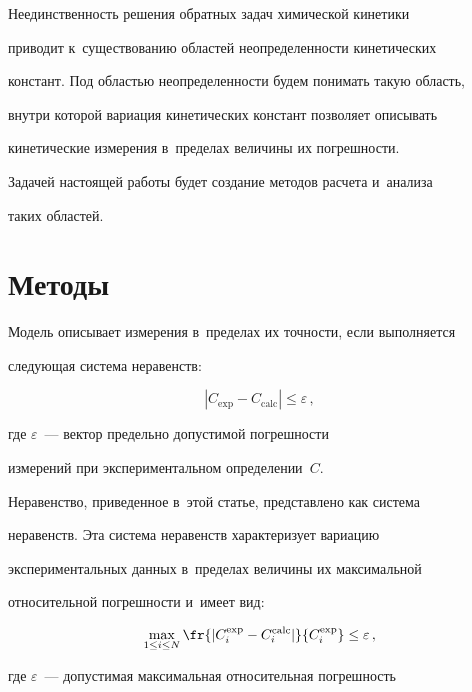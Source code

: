  

  Неединственность решения обратных задач химической кинетики 

приводит к~существованию областей неопределенности кинетических 

констант. Под об\-ластью неопределенности будем понимать такую область, 

внутри которой вариация кинетических констант позволяет описывать 

кинетические измерения в~пределах величины их погрешности. 

  

  Задачей настоящей работы будет создание методов расчета и~анализа 

таких областей. 

  

  \section{Методы}

  

  Модель описывает измерения в~пределах их точности, если выполняется 

следующая система неравенств:

  $$

  \left\vert C_{\mathrm{exp}} -C_{\mathrm{calc}}\right\vert \leq \varepsilon\,,

  $$

где $\varepsilon$~--- вектор предельно допустимой погрешности 

измерений при экспериментальном определении~$C$.



  Неравенство, приведенное в~этой статье, представлено как система 

неравенств. Эта система неравенств характеризует вариацию 

экспериментальных данных в~пределах величины их максимальной 

относительной погрешности и~имеет вид:

  \begin{equation}

  \max\limits_{1\leq i\leq N} \fr{\vert C_i^{\mathrm{exp}} -

C_i^{\mathrm{calc}}\vert}{C_i^{\mathrm{exp}}}\leq \varepsilon\,,

  \label{e1-sp}

  \end{equation}

где $\varepsilon$~--- допустимая максимальная относительная погрешность 

